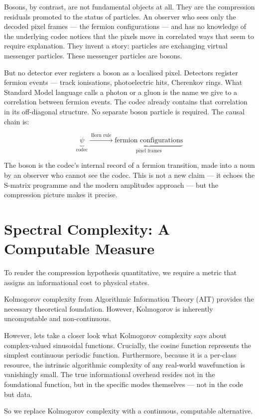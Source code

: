 Bosons, by contrast, are not fundamental objects at all. They are the
compression residuals promoted to the status of particles. An observer
who sees only the decoded pixel frames --- the fermion configurations ---
and has no knowledge of the underlying codec notices that the pixels
move in correlated ways that seem to require explanation. They invent a
story: particles are exchanging virtual messenger particles. These
messenger particles are bosons.

But no detector ever registers a boson as a localised pixel. Detectors
register fermion events --- track ionisations, photoelectric hits,
Cherenkov rings. What Standard Model language calls a photon or a gluon
is the name we give to a correlation between fermion events. The codec
already contains that correlation in its off-diagonal structure. No
separate boson particle is required. The causal chain is:

\[
\underbrace{\psi}_{\text{codec}}
\xrightarrow{\;\text{Born rule}\;}
\underbrace{\text{fermion configurations}}_{\text{pixel frames}}
\]

The boson is the codec's internal record of a fermion transition, made
into a noun by an observer who cannot see the codec. This is not a new
claim --- it echoes the S-matrix programme and the modern amplitudes
approach --- but the compression picture makes it precise.

\section{Spectral Complexity: A Computable Measure}

To render the compression hypothesis quantitative,
we require a metric that assigns an informational cost to physical states.

Kolmogorov complexity from Algorithmic Information Theory (AIT) provides the
necessary theoretical foundation. However, Kolmogorov is inherently
uncomputable and non-continuous.

However, lets take a closer look what Kolmogorov complexity says
about complex-valued sinusoidal functions.
Crucially, the cosine function represents the simplest continuous periodic function.
Furthermore, because it is a per-class resource, the intrinsic algorithmic complexity
of any real-world wavefunction is vanishingly small.
The true informational overhead resides not in the foundational function,
but in the specific modes themselves --- not in the code but data.

So we replace Kolmogorov complexity with a continuous, computable alternative.

